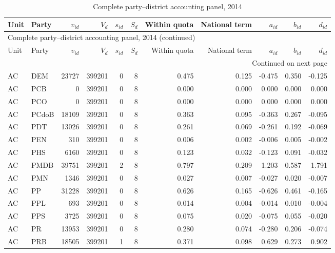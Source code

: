 \begin{landscape}
\begingroup
\tiny
\setlength{\tabcolsep}{3.2pt}
\begin{longtable}{llrrrrrrrrr}
\caption{Complete party--district accounting panel, 2014}\label{tab:intermediate-party-district-2014} \\
\toprule
Unit & Party & \(v_{id}\) & \(V_d\) & \(s_{id}\) & \(S_d\) & Within quota & National term & \(a_{id}\) & \(b_{id}\) & \(d_{id}\) \\
\midrule
\endfirsthead
\multicolumn{11}{l}{\footnotesize Complete party--district accounting panel, 2014 (continued)} \\
\toprule
Unit & Party & \(v_{id}\) & \(V_d\) & \(s_{id}\) & \(S_d\) & Within quota & National term & \(a_{id}\) & \(b_{id}\) & \(d_{id}\) \\
\midrule
\endhead
\midrule
\multicolumn{11}{r}{\footnotesize Continued on next page} \\
\endfoot
\bottomrule
\endlastfoot
AC & DEM & 23727 & 399201 & 0 & 8 & 0.475 & 0.125 & -0.475 & 0.350 & -0.125 \\
AC & PCB & 0 & 399201 & 0 & 8 & 0.000 & 0.000 & 0.000 & 0.000 & 0.000 \\
AC & PCO & 0 & 399201 & 0 & 8 & 0.000 & 0.000 & 0.000 & 0.000 & 0.000 \\
AC & PCdoB & 18109 & 399201 & 0 & 8 & 0.363 & 0.095 & -0.363 & 0.267 & -0.095 \\
AC & PDT & 13026 & 399201 & 0 & 8 & 0.261 & 0.069 & -0.261 & 0.192 & -0.069 \\
AC & PEN & 310 & 399201 & 0 & 8 & 0.006 & 0.002 & -0.006 & 0.005 & -0.002 \\
AC & PHS & 6160 & 399201 & 0 & 8 & 0.123 & 0.032 & -0.123 & 0.091 & -0.032 \\
AC & PMDB & 39751 & 399201 & 2 & 8 & 0.797 & 0.209 & 1.203 & 0.587 & 1.791 \\
AC & PMN & 1346 & 399201 & 0 & 8 & 0.027 & 0.007 & -0.027 & 0.020 & -0.007 \\
AC & PP & 31228 & 399201 & 0 & 8 & 0.626 & 0.165 & -0.626 & 0.461 & -0.165 \\
AC & PPL & 693 & 399201 & 0 & 8 & 0.014 & 0.004 & -0.014 & 0.010 & -0.004 \\
AC & PPS & 3725 & 399201 & 0 & 8 & 0.075 & 0.020 & -0.075 & 0.055 & -0.020 \\
AC & PR & 13953 & 399201 & 0 & 8 & 0.280 & 0.074 & -0.280 & 0.206 & -0.074 \\
AC & PRB & 18505 & 399201 & 1 & 8 & 0.371 & 0.098 & 0.629 & 0.273 & 0.902 \\

\end{longtable}
\end{landscape}
